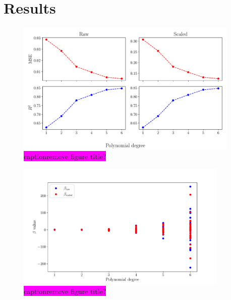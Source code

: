 \documentclass[aps,pra,english,notitlepage,reprint,nofootinbib]{revtex4-1}  %
\begin{document}
\section{Results}\label{sec:results}

\begin{figure}
  \vspace*{-5pt}
  \centering %
  \includegraphics[width=0.95\textwidth]{../figs/a_error_scaled_vs_raw.pdf}
  \caption{\colorbox{magenta}{caption}\colorbox{magenta}{remove figure title?}}\label{fig:a error scaled vs raw}
  \vspace*{-5pt}
\end{figure}

\begin{figure}
  \vspace*{-5pt}
  \centering %
  \includegraphics[width=0.9\textwidth]{../figs/a_beta_scaled_vs_raw.pdf}
  \caption{\colorbox{magenta}{caption}\colorbox{magenta}{remove figure title?}}\label{fig:a beta scaled vs raw}
  \vspace*{-5pt}
\end{figure}
\end{document}
